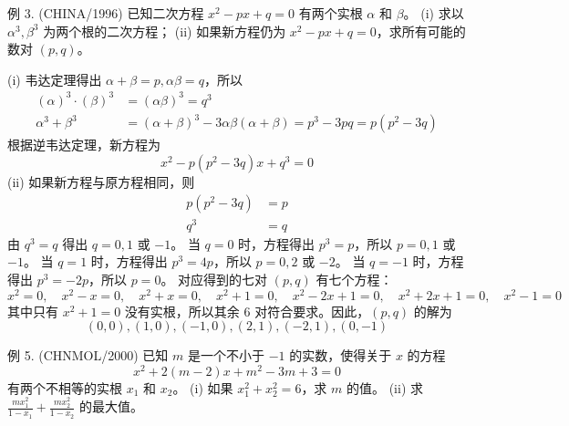 \begin{questions}
\question 例 3. (CHINA/1996) 已知二次方程 $x^2 - px + q = 0$ 有两个实根 $\alpha$ 和 $\beta$。
(i) 求以 $\alpha^3, \beta^3$ 为两个根的二次方程；
(ii) 如果新方程仍为 $x^2 - px + q = 0$，求所有可能的数对 $(p, q)$。

\begin{solution}
(i) 韦达定理得出 $\alpha + \beta = p, \alpha\beta = q$，所以
\begin{align*}
(\alpha)^3 \cdot (\beta)^3 &= (\alpha\beta)^3 = q^3 \\
\alpha^3 + \beta^3 &= (\alpha + \beta)^3 - 3\alpha\beta(\alpha + \beta) = p^3 - 3pq = p(p^2 - 3q)
\end{align*}
根据逆韦达定理，新方程为
\[
x^2 - p(p^2 - 3q)x + q^3 = 0
\]
(ii) 如果新方程与原方程相同，则
\begin{align*}
p(p^2 - 3q) &= p \\
q^3 &= q
\end{align*}
由 $q^3 = q$ 得出 $q = 0, 1$ 或 $-1$。
当 $q = 0$ 时，方程得出 $p^3 = p$，所以 $p = 0, 1$ 或 $-1$。
当 $q = 1$ 时，方程得出 $p^3 = 4p$，所以 $p = 0, 2$ 或 $-2$。
当 $q = -1$ 时，方程得出 $p^3 = -2p$，所以 $p = 0$。
对应得到的七对 $(p, q)$ 有七个方程：
\[
x^2 = 0, \quad x^2 - x = 0, \quad x^2 + x = 0, \quad x^2 + 1 = 0, \quad x^2 - 2x + 1 = 0, \quad x^2 + 2x + 1 = 0, \quad x^2 - 1 = 0
\]
其中只有 $x^2 + 1 = 0$ 没有实根，所以其余 6 对符合要求。因此，$(p, q)$ 的解为
\[
(0, 0), (1, 0), (-1, 0), (2, 1), (-2, 1), (0, -1)
\]
\end{solution}

\question 例 5. (CHNMOL/2000) 已知 $m$ 是一个不小于 $-1$ 的实数，使得关于 $x$ 的方程
\[
x^2 + 2(m - 2)x + m^2 - 3m + 3 = 0
\]
有两个不相等的实根 $x_1$ 和 $x_2$。
(i) 如果 $x_1^2 + x_2^2 = 6$，求 $m$ 的值。
(ii) 求 $\frac{mx_1^2}{1 - x_1} + \frac{mx_2^2}{1 - x_2}$ 的最大值。


\end{questions}
